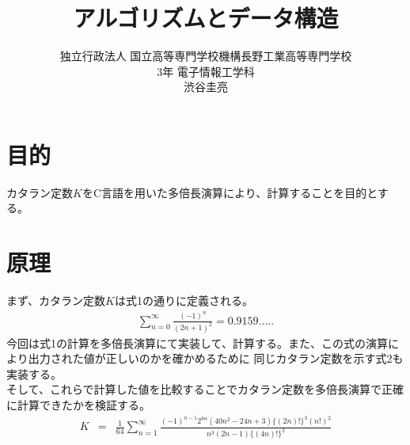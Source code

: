 \documentclass[a4j,dvipdfmx,titlepage]{jarticle}
\title{アルゴリズムとデータ構造}
\author{独立行政法人 国立高等専門学校機構長野工業高等専門学校
\\
3年 電子情報工学科
\\
渋谷圭亮
\\
}
\begin{document}
\maketitle
\section{目的}
カタラン定数$K$をC言語を用いた多倍長演算により、計算することを目的とする。
\section{原理}
まず、カタラン定数$K$は式1の通りに定義される。
\begin{eqnarray}
    \sum^{\infty}_{n=0}\frac{(-1)^{n}}{(2n+1)^2}=0.9159.....
\end{eqnarray}
今回は式1の計算を多倍長演算にて実装して、計算する。また、この式の演算により出力された値が正しいのかを確かめるために
同じカタラン定数を示す式2も実装する。\cite{catalan}\\
そして、これらで計算した値を比較することでカタラン定数を多倍長演算で正確に計算できたかを検証する。
\begin{eqnarray}
    K&=&\frac{1}{64}\sum^{\infty}_{n=1}\frac{(-1)^{n-1}2^{8n}(40n^2-24n+3)\{(2n)!\}^{3}(n!)^2}{n^3(2n-1)\{(4n)!\}^2}
\end{eqnarray}
\end{document}
